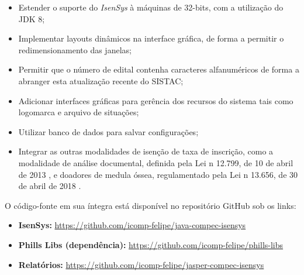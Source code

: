 \documentclass[
	12pt,			%
	openright,		%
	oneside,	
	a4paper,		%
	english,		%
	brazil			%
]{abntex2/abntex2}  %
\begin{document}
			\begin{itemize}
				
				\item Estender o suporte do \textit{IsenSys} à máquinas de 32-bits, com a utilização do JDK 8;
				\item Implementar layouts dinâmicos na interface gráfica, de forma a permitir o redimensionamento das janelas;
				\item Permitir que o número de edital contenha caracteres alfanuméricos de forma a abranger esta atualização recente do SISTAC;
				\item Adicionar interfaces gráficas para gerência dos recursos do sistema tais como logomarca e arquivo de situações;
				\item Utilizar banco de dados para salvar configurações;
				\item Integrar as outras modalidades de isenção de taxa de inscrição, como a modalidade de análise documental, definida pela Lei n{\textordmasculine} 12.799, de 10 de abril de 2013 \cite{lei-12799}, e doadores de medula óssea, regulamentado pela Lei n{\textordmasculine} 13.656, de 30 de abril de 2018 \cite{lei-13656}.
				
			\end{itemize}
			
			O código-fonte em sua íntegra está disponível no repositório GitHub sob os links:
			
			\begin{itemize}
				
				\item \textbf{IsenSys:} \url{https://github.com/icomp-felipe/java-compec-isensys}
				\item \textbf{Phills Libs (dependência):} \url{https://github.com/icomp-felipe/phills-libs}
				\item \textbf{Relatórios:} \url{https://github.com/icomp-felipe/jasper-compec-isensys}
				
			\end{itemize}

	\postextual

	
\end{document}
